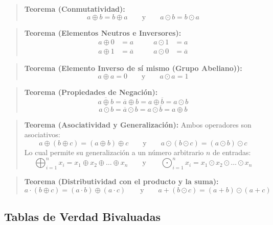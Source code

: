 \setcounter{tcb@cnt@teorema}{22}
\begin{quote}\textbf{Teorema (Conmutatividad):}\label{conmut_xor_eng}
\[ a \oplus b = b \oplus a \qquad \text{y} \qquad a \odot b = b \odot a \]
\end{quote}

\setcounter{tcb@cnt@teorema}{23}
\begin{quote}\textbf{Teorema (Elementos Neutros e Inversores):}\label{neutros_xor_eng}
\begin{align*}
    a \oplus 0 &= a \qquad & a \odot 1 &= a \\
    a \oplus 1 &= \overline{a} \qquad & a \odot 0 &= \overline{a}
\end{align*}
\end{quote}

\setcounter{tcb@cnt@teorema}{24}
\begin{quote}\textbf{Teorema (Elemento Inverso de sí mismo (Grupo Abeliano)):}\label{idemp_nula_eng}
\[ a \oplus a = 0 \qquad \text{y} \qquad a \odot a = 1 \]
\end{quote}

\setcounter{tcb@cnt@teorema}{25}
\begin{quote}\textbf{Teorema (Propiedades de Negación):}\label{neg_xor_eng}
\[ \overline{a \oplus b} = \overline{a} \oplus b = a \oplus \overline{b} = a \odot b \]
\[ \overline{a \odot b} = \overline{a} \odot b = a \odot \overline{b} = a \oplus b \]
\end{quote}

\setcounter{tcb@cnt@teorema}{26}
\begin{quote}\textbf{Teorema (Asociatividad y Generalización):}\label{asoc_gen_xor_eng}
Ambos operadores son asociativos:
\[ a \oplus (b \oplus c) = (a \oplus b) \oplus c \qquad \text{y} \qquad a \odot (b \odot c) = (a \odot b) \odot c \]
Lo cual permite su generalización a un número arbitrario $n$ de entradas:
\[ \bigoplus_{i=1}^{n} x_i = x_1 \oplus x_2 \oplus \dots \oplus x_n \qquad \text{y} \qquad \bigodot_{i=1}^{n} x_i = x_1 \odot x_2 \odot \dots \odot x_n \]
\end{quote}

\setcounter{tcb@cnt@teorema}{28}
\begin{quote}\textbf{Teorema (Distributividad con el producto y la suma):}\label{dist_xor_eng}
\[ a \cdot (b \oplus c) = (a \cdot b) \oplus (a \cdot c) \qquad \text{y} \qquad a + (b \odot c) = (a + b) \odot (a + c) \]
\end{quote}

\subsection*{Tablas de Verdad Bivaluadas}


